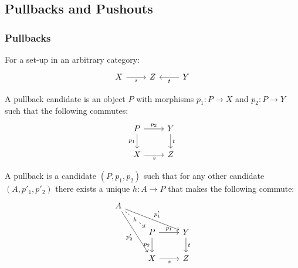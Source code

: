\subsection{Pullbacks and Pushouts}

\subsubsection*{Pullbacks}

\begin{definition}
  For a set-up in an arbitrary category:
  \parencite{leinster:basic_category_theory}
  \[\begin{tikzcd}[ampersand replacement=\&]
    X \& Z \& Y
    \arrow["t", from=1-3, to=1-2]
    \arrow["s"', from=1-1, to=1-2]
  \end{tikzcd}\]

  A pullback candidate is an object $P$ with morphisms $p_1:P\to X$ and
  $p_2:P\to Y$ such that the following commutes:
  \[\begin{tikzcd}[ampersand replacement=\&]
    P \& Y \\
    X \& Z
    \arrow["t", from=1-2, to=2-2]
    \arrow["s"', from=2-1, to=2-2]
    \arrow["{p_2}", from=1-1, to=1-2]
    \arrow["{p_1}"', from=1-1, to=2-1]
  \end{tikzcd}\]

  A pullback is a candidate $(P, p_1, p_2)$ such that for any other candidate
  $(A, p'_1, p'_2)$ there exists a unique $h:A\to P$ that makes the following
  commute:
  \[\begin{tikzcd}[ampersand replacement=\&]
    A \\
    \& P \& Y \\
    \& X \& Z
    \arrow["{p_2}"', from=2-2, to=3-2]
    \arrow["{p_1}", from=2-2, to=2-3]
    \arrow["t", from=2-3, to=3-3]
    \arrow["s"', from=3-2, to=3-3]
    \arrow["{p'_2}"', from=1-1, to=3-2]
    \arrow["{p'_1}", from=1-1, to=2-3]
    \arrow["h"{description}, dashed, from=1-1, to=2-2]
  \end{tikzcd}\]
\end{definition}

